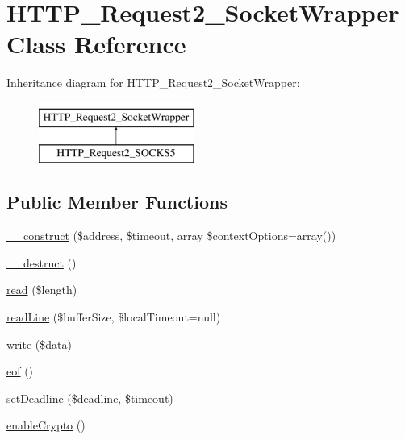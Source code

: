 \hypertarget{classHTTP__Request2__SocketWrapper}{\section{H\-T\-T\-P\-\_\-\-Request2\-\_\-\-Socket\-Wrapper Class Reference}
\label{classHTTP__Request2__SocketWrapper}
}
Inheritance diagram for H\-T\-T\-P\-\_\-\-Request2\-\_\-\-Socket\-Wrapper\-:\begin{figure}[H]
\begin{center}
\leavevmode
\includegraphics[height=2.000000cm]{classHTTP__Request2__SocketWrapper}
\end{center}
\end{figure}
\subsection*{Public Member Functions}
\begin{DoxyCompactItemize}
\item 
\hyperlink{classHTTP__Request2__SocketWrapper_a3a59e9400c03f4f9aa6b2c2659f22512}{\-\_\-\-\_\-construct} (\$address, \$timeout, array \$context\-Options=array())
\item 
\hyperlink{classHTTP__Request2__SocketWrapper_af5176bcee9170ae7d4d9c00aadbfcde3}{\-\_\-\-\_\-destruct} ()
\item 
\hyperlink{classHTTP__Request2__SocketWrapper_a5e483244689fefacb4b774fde087c60d}{read} (\$length)
\item 
\hyperlink{classHTTP__Request2__SocketWrapper_a7b6d59527741b687f3de869bdd6bb1bf}{read\-Line} (\$buffer\-Size, \$local\-Timeout=null)
\item 
\hyperlink{classHTTP__Request2__SocketWrapper_ac0c9f5044043c4e55efe5f1d71ac63a1}{write} (\$data)
\item 
\hyperlink{classHTTP__Request2__SocketWrapper_a25df9e4044072eabf76add57013b205e}{eof} ()
\item 
\hyperlink{classHTTP__Request2__SocketWrapper_a5bb5243d3cde9ec3eadcdbed1a3ffba4}{set\-Deadline} (\$deadline, \$timeout)
\item 
\hyperlink{classHTTP__Request2__SocketWrapper_a541cea424faf35b039273eb4c5a8472a}{enable\-Crypto} ()
\end{DoxyCompactItemize}
